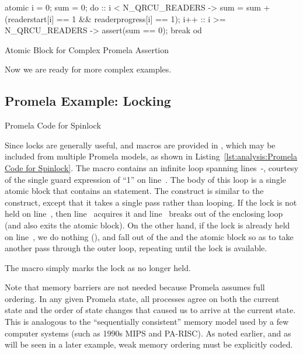 \begin{listing}[tbp]
\begin{VerbatimL}
atomic {
	i = 0;
	sum = 0;
	do
	:: i < N_QRCU_READERS ->
		sum = sum + (readerstart[i] == 1 &&
		             readerprogress[i] == 1);
		i++
	:: i >= N_QRCU_READERS ->
		assert(sum == 0);
		break
	od
}
\end{VerbatimL}
\caption{Atomic Block for Complex Promela Assertion}
\label{lst:analysis:Atomic Block for Complex Promela Assertion}
\end{listing}

Now we are ready for more complex examples.

\subsection{Promela Example: Locking}
\label{sec:formal:Promela Example: Locking}

\begin{listing}[tbp]

\caption{Promela Code for Spinlock}
\label{lst:analysis:Promela Code for Spinlock}
\end{listing}

\begin{lineref}
Since locks are generally useful,  and
macros are provided in , which may be included from
multiple Promela models, as shown in
Listing~\ref{lst:analysis:Promela Code for Spinlock}.
The  macro contains an infinite  loop
spanning lines~-,
courtesy of the single guard expression of ``1'' on line~.
The body of this loop is a single atomic block that contains
an  statement.
The  construct is similar to the  construct, except
that it takes a single pass rather than looping.
If the lock is not held on line~, then
line~ acquires it and
line~ breaks out of the enclosing  loop (and also exits
the atomic block).
On the other hand, if the lock is already held on line~,
we do nothing (), and fall out of the  and the
atomic block so as to take another pass through the outer
loop, repeating until the lock is available.
\end{lineref}

The  macro simply marks the lock as no
longer held.

Note that memory barriers are not needed because Promela assumes
full ordering.
In any given Promela state, all processes agree on both the current
state and the order of state changes that caused us to arrive at
the current state.
This is analogous to the ``sequentially consistent'' memory model
used by a few computer systems (such as 1990s MIPS and PA-RISC).
As noted earlier, and as will be seen in a later example,
weak memory ordering must be explicitly coded.

